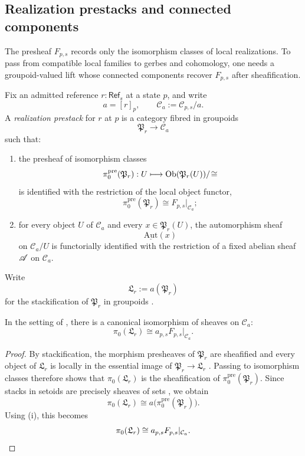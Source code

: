 \subsection{Realization prestacks and connected components}

The presheaf $F_{p,s}$ records only the isomorphism classes of local realizations. To pass from compatible local families to gerbes and cohomology, one needs a groupoid-valued lift whose connected components recover $F_{p,s}$ after sheafification.

\begin{definition}\label{def:realization-prestack}
Fix an admitted reference $r:\mathsf{Ref}_s$ at a state $p$, and write
\[
a=[r]_p,
\qquad
\mathcal C_a:=\mathcal C_{p,s}/a.
\]
A \emph{realization prestack} for $r$ at $p$ is a category fibred in groupoids
\[
\mathfrak P_r\to \mathcal C_a
\]
such that:
\begin{enumerate}[label=(\roman*),nosep]
\item the presheaf of isomorphism classes
\[
\pi_0^{\mathrm{pre}}(\mathfrak P_r):U\longmapsto \mathrm{Ob}(\mathfrak P_r(U))/\!\cong
\]
is identified with the restriction of the local object functor,
\[
\pi_0^{\mathrm{pre}}(\mathfrak P_r)\cong F_{p,s}|_{\mathcal C_a};
\]
\item for every object $U$ of $\mathcal C_a$ and every $x\in \mathfrak P_r(U)$, the automorphism sheaf
\[
\underline{\mathrm{Aut}}(x)
\]
on $\mathcal C_a/U$ is functorially identified with the restriction of a fixed abelian sheaf $\mathscr{A}$ on $\mathcal C_a$.
\end{enumerate}
Write
\[
\mathfrak L_r:=a(\mathfrak P_r)
\]
for the stackification of $\mathfrak P_r$ in groupoids \cite[Tag 02ZP]{StacksProject}.
\end{definition}

\begin{proposition}\label{prop:stackification-components}
In the setting of , there is a canonical isomorphism of sheaves on $\mathcal C_a$:
\[
\pi_0(\mathfrak L_r)\cong a_{p,s}F_{p,s}|_{\mathcal C_a}.
\]
\end{proposition}

\begin{proof}
By stackification, the morphism presheaves of $\mathfrak P_r$ are sheafified and every object of $\mathfrak L_r$ is locally in the essential image of $\mathfrak P_r\to \mathfrak L_r$ \cite[Tag 02ZP]{StacksProject}. Passing to isomorphism classes therefore shows that $\pi_0(\mathfrak L_r)$ is the sheafification of $\pi_0^{\mathrm{pre}}(\mathfrak P_r)$. Since stacks in setoids are precisely sheaves of sets \cite[Tag 042Y]{StacksProject}, we obtain
\[
\pi_0(\mathfrak L_r)\cong a\bigl(\pi_0^{\mathrm{pre}}(\mathfrak P_r)\bigr).
\]
Using (i), this becomes
\[
\pi_0(\mathfrak L_r)\cong a_{p,s}F_{p,s}|_{\mathcal C_a}.
\qedhere
\]
\end{proof}

